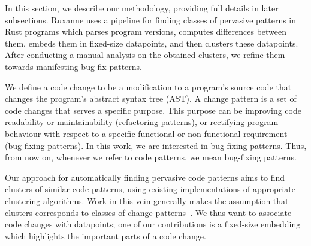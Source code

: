 
In this section, we describe our methodology, providing full details in later subsections. Ruxanne uses a pipeline for finding classes of pervasive patterns in Rust programs which parses program versions, computes differences between them, embeds them in fixed-size datapoints, and then clusters these datapoints. After conducting a manual analysis on the obtained clusters, we refine them towards manifesting bug fix patterns.

We define a code change to be a modification to a program's source code that changes the program's abstract syntax tree (AST). A change pattern is a set of code changes that serves a specific purpose. This purpose can be improving code readability or maintainability (refactoring patterns), or rectifying program behaviour with respect to a specific functional or non-functional requirement (bug-fixing patterns). In this work, we are interested in bug-fixing patterns. Thus, from now on, whenever we refer to code patterns, we mean bug-fixing patterns.

Our approach for automatically finding pervasive code patterns aims to find clusters of similar code patterns, using existing implementations of appropriate clustering algorithms. Work in this vein generally makes the assumption that clusters corresponds to classes of change patterns~\citep{hanam2016discovering,campos2019discovering,yang2022mining}. We thus want to associate code changes with datapoints; one of our contributions is a fixed-size embedding which highlights the important parts of a code change.




